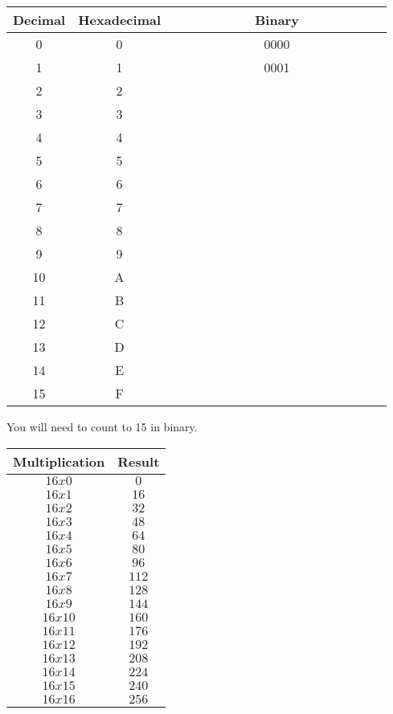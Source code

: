 \documentclass[letterpaper,12pt]{exam}
\begin{document}
\begin{center}
\begin{tabular}{| c | c | c |}
    \hline
        Decimal & Hexadecimal & \ \ \ \ \ \ \ \ \ \ \ Binary\ \ \ \ \ \ \ \ \ \ \ \\
        \hline
    0 & 0 & 0000 \\ 
    1 & 1 & 0001 \\  
\hline
    2 & 2 & \  \\ 
    3 & 3 & \  \\  
\hline
    4 & 4 & \  \\ 
    5 & 5 & \  \\  
\hline
    6 & 6 & \  \\ 
    7 & 7 & \  \\  
\hline
    8 & 8 & \  \\ 
    9 & 9 & \  \\  
\hline
    10 & A & \  \\ 
    11 & B & \  \\  
\hline
    12 & C & \  \\ 
    13 & D & \  \\  
\hline
    14 & E & \  \\ 
    15 & F & \  \\  
\hline
\end{tabular}
\par
You will need to count to 15 in binary.

\end{center}

\par
\begin{center}
\begin{tabular}{| c | c |}
 \hline
    Multiplication & Result \\
    \hline
 $16 x 0 $ & $ 0 $ \\ 
 $16 x 1 $ & $ 16 $ \\ 
\hline
 $16 x 2 $ & $ 32 $ \\ 
 $16 x 3 $ & $ 48 $ \\ 
\hline
 $16 x 4 $ & $ 64 $ \\ 
 $16 x 5 $ & $ 80 $ \\ 
\hline
 $16 x 6 $ & $ 96 $ \\ 
 $16 x 7 $ & $ 112 $ \\ 
\hline
 $16 x 8 $ & $ 128 $ \\ 
 $16 x 9 $ & $ 144 $ \\ 
\hline
 $16 x 10 $ & $ 160 $ \\ 
 $16 x 11 $ & $ 176 $ \\ 
\hline
 $16 x 12 $ & $ 192 $ \\ 
 $16 x 13 $ & $ 208 $ \\ 
\hline
 $16 x 14 $ & $ 224 $ \\ 
 $16 x 15 $ & $ 240 $ \\ 
\hline
 $16 x 16 $ & $ 256 $ \\   
\hline
\end{tabular}
\end{center}
 
\end{document}
